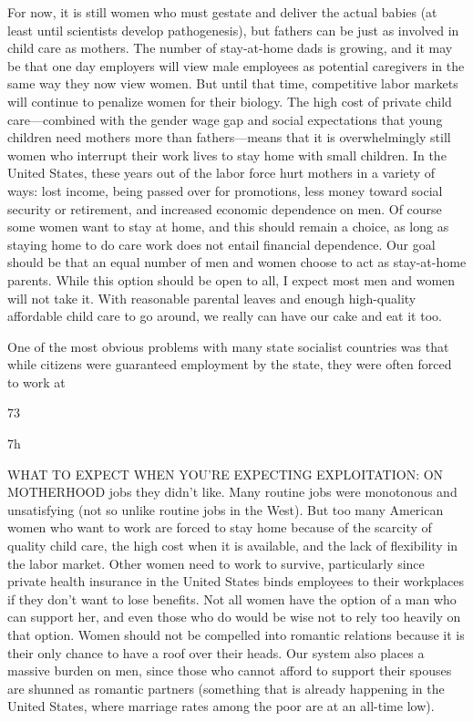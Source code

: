 For now, it is still women who must gestate and deliver the actual babies (at least until scientists develop pathogenesis), but fathers can be just as involved in child care as mothers. The number of stay-at-home dads is growing, and it may be that one day employers will view male employees as potential caregivers in the same way they now view women. But until that time, competitive labor markets will continue to penalize women for their biology. The high cost of private child care—combined with the gender wage gap and social expectations that young children need mothers more than fathers—means that it is overwhelmingly still women who interrupt their work lives to stay home with small children. In the United States, these years out of the labor force hurt mothers in a variety of ways: lost income, being passed over for promotions, less money toward social security or retirement, and increased economic dependence on men. Of course some women want to stay at home, and this should remain a choice, as long as staying home to do care work does not entail financial dependence. Our goal should be that an equal number of men and women choose to act as stay-at-home parents. While this option should be open to all, I expect most men and women will not take it. With reasonable parental leaves and enough high-quality affordable child care to go around, we really can have our cake and eat it too.
 \par 
One of the most obvious problems with many state socialist countries was that while citizens were guaranteed employment by the state, they were often forced to work at
 \par 
73
 \par 
7h
 \par 
WHAT TO EXPECT WHEN YOU'RE EXPECTING EXPLOITATION: ON MOTHERHOOD jobs they didn’t like. Many routine jobs were monotonous and unsatisfying (not so unlike routine jobs in the West). But too many American women who want to work are forced to stay home because of the scarcity of quality child care, the high cost when it is available, and the lack of flexibility in the labor market. Other women need to work to survive, particularly since private health insurance in the United States binds employees to their workplaces if they don’t want to lose benefits. Not all women have the option of a man who can support her, and even those who do would be wise not to rely too heavily on that option. Women should not be compelled into romantic relations because it is their only chance to have a roof over their heads. Our system also places a massive burden on men, since those who cannot afford to support their spouses are shunned as romantic partners (something that is already happening in the United States, where marriage rates among the poor are at an all-time low).

